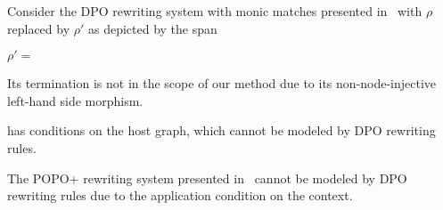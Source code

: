 \begin{example}
  \label{ex:overbeek_5d6_bis} 
  Consider the DPO rewriting system with monic matches presented in~\cite[Example 5.6]{overbeek2024termination_lmcs} with $\rho$ replaced by $\rho'$ as depicted by the span 
  \begin{center}
    $\rho' = $\scalebox{0.9} { }
  \end{center}

  Its termination is not in the scope of our method due to its non-node-injective left-hand side morphism. 
\end{example}

\begin{example}
  \cite[Example 5.7]{overbeek2024termination_lmcs} has conditions on the host graph, which cannot be modeled by DPO rewriting rules. 
\end{example}
\begin{example}
  The POPO+ rewriting system presented in~\cite[Example 5.7]{overbeek2024termination_lmcs} cannot be modeled by DPO rewriting rules due to the application condition on the context.


\end{example}



